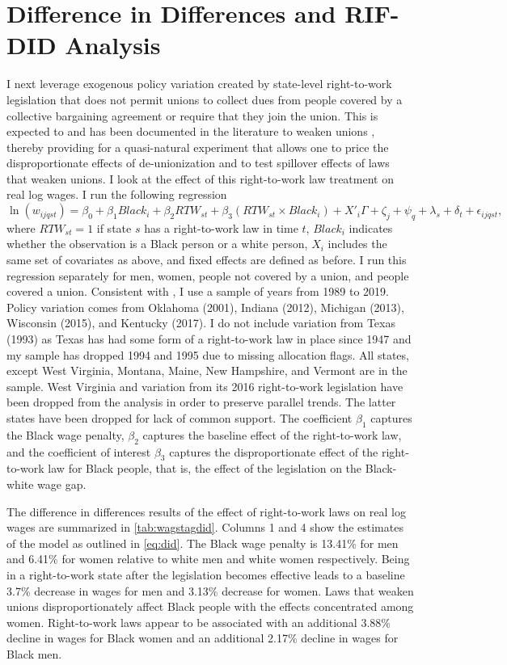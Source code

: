 \documentclass[11pt]{article}
\begin{document}
\section{Difference in Differences and RIF-DID Analysis}\label{sec:did}
I next leverage exogenous policy variation created by state-level right-to-work legislation that does not permit unions to collect dues from people covered by a collective bargaining agreement or require that they join the union. This is expected to and has been documented in the literature to weaken unions \citep[see, for example, ][]{taschereau-dumouchel2020}, thereby providing for a quasi-natural experiment that allows one to price the disproportionate effects of de-unionization and to test spillover effects of laws that weaken unions. I look at the effect of this right-to-work law treatment on real log wages. I run the following regression
\begin{equation}\label{eq:did}
\ln(w_{ijqst}) = \beta_0 + \beta_1Black_i + \beta_2RTW_{st} + \beta_3(RTW_{st}\times Black_i) + X'_i\Gamma +\zeta_j + \psi_q + \lambda_s + \delta_t + \epsilon_{ijqst},  
\end{equation}
where $RTW_{st} = 1$ if state $s$ has a right-to-work law in time $t$, $Black_i$ indicates whether the observation is a Black person or a white person, $X_i$ includes the same set of covariates as above, and fixed effects are defined as before. I run this regression separately for men, women, people not covered by a union, and people covered a union. Consistent with \cite{taschereau-dumouchel2020}, I use a sample of years from 1989 to 2019. Policy variation comes from Oklahoma (2001), Indiana (2012), Michigan (2013), Wisconsin (2015), and Kentucky (2017). I do not include variation from Texas (1993) as Texas has had some form of a right-to-work law in place since 1947 and my sample has dropped 1994 and 1995 due to missing allocation flags. All states, except West Virginia, Montana, Maine, New Hampshire, and Vermont are in the sample. West Virginia and variation from its 2016 right-to-work legislation have been dropped from the analysis in order to preserve parallel trends. The latter states have been dropped for lack of common support. The coefficient $\beta_1$ captures the Black wage penalty, $\beta_2$ captures the baseline effect of the right-to-work law, and the coefficient of interest $\beta_3$ captures the disproportionate effect of the right-to-work law for Black people, that is, the effect of the legislation on the Black-white wage gap.

The difference in differences results of the effect of right-to-work laws on real log wages are summarized in \autoref{tab:wagstagdid}. Columns 1 and 4 show the estimates of the model as outlined in \autoref{eq:did}. The Black wage penalty is 13.41\% for men and 6.41\% for women relative to white men and white women respectively. Being in a right-to-work state after the legislation becomes effective leads to a baseline 3.7\% decrease in wages for men and 3.13\% decrease for women. Laws that weaken unions disproportionately affect Black people with the effects concentrated among women. Right-to-work laws appear to be associated with an additional 3.88\% decline in wages for Black women and an additional 2.17\% decline in wages for Black men. 
\end{document}
